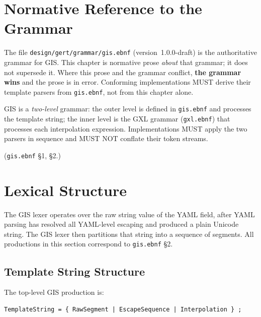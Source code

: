 \section{Normative Reference to the Grammar}
\label{sec:gis:normref}

The file \texttt{design/gert/grammar/gis.ebnf} (version~1.0.0-draft) is the
authoritative grammar for GIS\@.  This chapter is normative prose \emph{about}
that grammar; it does not supersede it.  Where this prose and the grammar
conflict, \textbf{the grammar wins} and the prose is in error.  Conforming
implementations MUST derive their template parsers from \texttt{gis.ebnf},
not from this chapter alone.

GIS is a \emph{two-level} grammar: the outer level is defined in
\texttt{gis.ebnf} and processes the template string; the inner level is the
GXL grammar (\texttt{gxl.ebnf}) that processes each interpolation expression.
Implementations MUST apply the two parsers in sequence and MUST NOT conflate
their token streams.

(\texttt{gis.ebnf} \S1, \S2.)

\section{Lexical Structure}
\label{sec:gis:lexical}

The GIS lexer operates over the raw string value of the YAML field,
after YAML parsing has resolved all YAML-level escaping and produced a
plain Unicode string.
The GIS lexer then partitions that string into a sequence of segments.
All productions in this section correspond to \texttt{gis.ebnf} \S2.

\subsection{Template String Structure}
\label{subsec:gis:template-string}

The top-level GIS production is:

\begin{verbatim}
TemplateString = { RawSegment | EscapeSequence | Interpolation } ;
\end{verbatim}


